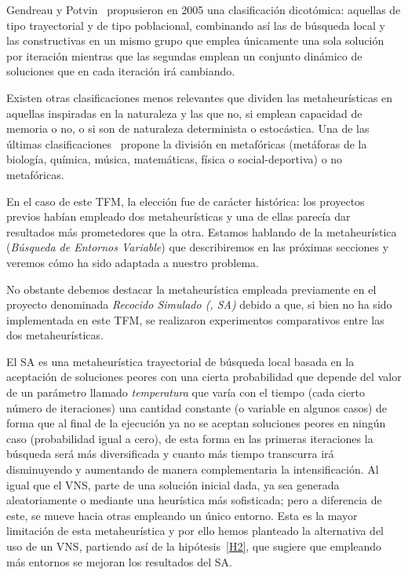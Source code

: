 Gendreau y Potvin~\cite{metaheuristicas:taxonomia2} propusieron en 2005 una clasificación dicotómica: aquellas de tipo trayectorial y de tipo poblacional, combinando así las de búsqueda local y las constructivas en un mismo grupo que emplea únicamente una sola solución por iteración mientras que las segundas emplean un conjunto dinámico de soluciones que en cada iteración irá cambiando.

Existen otras clasificaciones menos relevantes que dividen las metaheurísticas en aquellas inspiradas en la naturaleza y las que no, si emplean capacidad de memoria o no, o si son de naturaleza determinista o estocástica. Una de las últimas clasificaciones~\cite{sota:metaheuristicas} propone la división en metafóricas (metáforas de la biología, química, música, matemáticas, física o social-deportiva) o no metafóricas.

En el caso de este TFM, la elección fue de carácter histórica: los proyectos previos habían empleado dos metaheurísticas y una de ellas parecía dar resultados más prometedores que la otra. Estamos hablando de la metaheurística \vns{} (\textit{Búsqueda de Entornos Variable}) que describiremos en las próximas secciones y veremos cómo ha sido adaptada a nuestro problema.

No obstante debemos destacar la metaheurística empleada previamente en el proyecto \legacy{} denominada \textit{Recocido Simulado (\sa{}, SA)} debido a que, si bien no ha sido implementada en este TFM, se realizaron experimentos comparativos entre las dos metaheurísticas.

El SA es una metaheurística trayectorial de búsqueda local basada en la aceptación de soluciones peores con una cierta probabilidad que depende del valor de un parámetro llamado \textit{temperatura} que varía con el tiempo (cada cierto número de iteraciones) una cantidad constante (o variable en algunos casos) de forma que al final de la ejecución ya no se aceptan soluciones peores en ningún caso (probabilidad igual a cero), de esta forma en las primeras iteraciones la búsqueda será más diversificada y cuanto más tiempo transcurra irá disminuyendo y aumentando de manera complementaria la intensificación. Al igual que el VNS, parte de una solución inicial dada, ya sea generada aleatoriamente o mediante una heurística más sofisticada; pero a diferencia de este, se mueve hacia otras empleando un único entorno. Esta es la mayor limitación de esta metaheurística y por ello hemos planteado la alternativa del uso de un VNS, partiendo así de la hipótesis~\ref{H2}, que sugiere que empleando más entornos se mejoran los resultados del SA\@.

